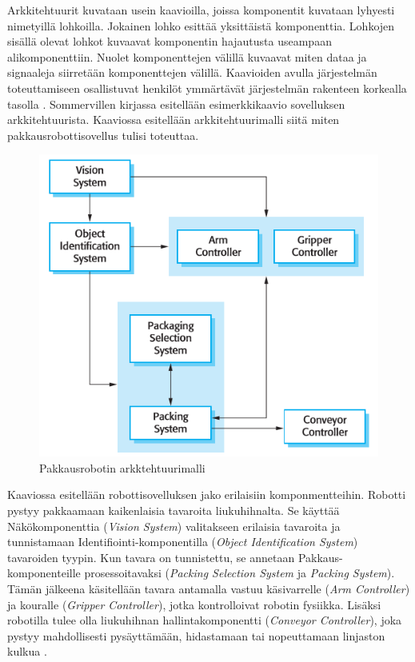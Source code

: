 \documentclass[utf8]{gradu3}
\begin{document}
Arkkitehtuurit kuvataan usein kaavioilla, joissa komponentit kuvataan lyhyesti nimetyillä lohkoilla. Jokainen lohko esittää yksittäistä komponenttia. Lohkojen sisällä olevat lohkot kuvaavat komponentin hajautusta useampaan alikomponenttiin. Nuolet komponenttejen välillä kuvaavat miten dataa ja signaaleja siirretään komponenttejen välillä. Kaavioiden avulla järjestelmän toteuttamiseen osallistuvat henkilöt ymmärtävät järjestelmän rakenteen korkealla tasolla \parencite[s. 150]{Sommerville}. Sommervillen kirjassa esitellään esimerkkikaavio sovelluksen arkkitehtuurista. Kaaviossa esitellään arkkitehtuurimalli siitä miten pakkausrobottisovellus tulisi toteuttaa.

\begin{figure}[h]
\centering
\includegraphics[scale=0.85]{architecture.png}
\caption{Pakkausrobotin arkktehtuurimalli \parencite[s.149]{Sommerville}}
\end{figure}

Kaaviossa esitellään robottisovelluksen jako erilaisiin komponmentteihin. Robotti pystyy pakkaamaan kaikenlaisia tavaroita liukuhihnalta. Se käyttää Näkökomponenttia (\emph{Vision System}) valitakseen erilaisia tavaroita ja tunnistamaan Identifiointi-komponentilla (\emph{Object Identification System}) tavaroiden tyypin. Kun tavara on tunnistettu, se annetaan Pakkaus-komponenteille prosessoitavaksi (\emph{Packing Selection System} ja \emph{Packing System}). Tämän jälkeena käsitellään tavara antamalla vastuu käsivarrelle (\emph{Arm Controller}) ja kouralle (\emph{Gripper Controller}), jotka kontrolloivat robotin fysiikka. Lisäksi robotilla tulee olla liukuhihnan hallintakomponentti (\emph{Conveyor Controller}), joka pystyy mahdollisesti pysäyttämään, hidastamaan tai nopeuttamaan linjaston kulkua \parencite[s.148]{Sommerville}.
\end{document}
